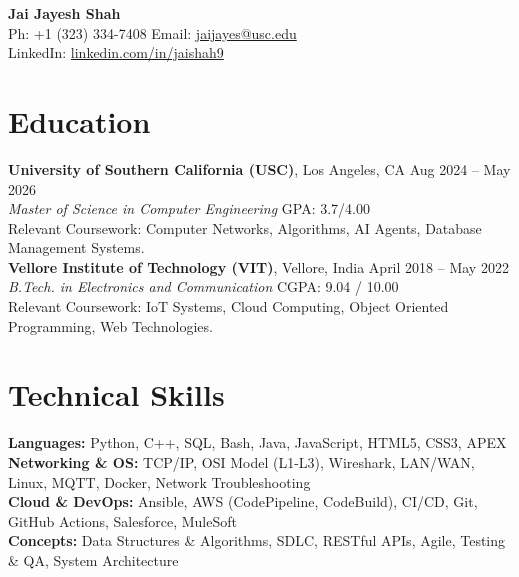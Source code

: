 \documentclass[letterpaper,10pt]{article}
\begin{document}
\begin{center}
    {\LARGE \textbf{Jai Jayesh Shah}} \\
    \vspace{4pt}
    \small
    Ph: +1 (323) 334-7408 \quad Email: \href{mailto:jaijayes@usc.edu}{jaijayes@usc.edu} \\
    LinkedIn: \href{https://www.linkedin.com/in/jaishah9}{linkedin.com/in/jaishah9} \\
    \vspace{-10pt}
\end{center}

\section*{Education}
    \textbf{University of Southern California (USC)}, Los Angeles, CA \hfill Aug 2024 -- May 2026 \\
    \textit{Master of Science in Computer Engineering} \hfill GPA: 3.7/4.00 \\
    Relevant Coursework: Computer Networks, Algorithms, AI Agents, Database Management Systems. \\

    \vspace{2pt}
    \textbf{Vellore Institute of Technology (VIT)}, Vellore, India \hfill April 2018 -- May 2022 \\
    \textit{B.Tech. in Electronics and Communication} \hfill CGPA: 9.04 / 10.00 \\
    Relevant Coursework: IoT Systems, Cloud Computing, Object Oriented Programming, Web Technologies.

\section*{Technical Skills}
    \textbf{Languages:} Python, C++, SQL, Bash, Java, JavaScript, HTML5, CSS3, APEX \\
    \textbf{Networking \& OS:} TCP/IP, OSI Model (L1-L3), Wireshark, LAN/WAN, Linux, MQTT, Docker, Network Troubleshooting \\
    \textbf{Cloud \& DevOps:} Ansible, AWS (CodePipeline, CodeBuild), CI/CD, Git, GitHub Actions, Salesforce, MuleSoft \\
    \textbf{Concepts:} Data Structures \& Algorithms, SDLC, RESTful APIs, Agile, Testing \& QA, System Architecture

\end{document}
